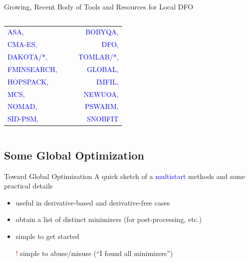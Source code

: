 \documentclass[handout,aspectratio=54]{beamer}
\numberwithin{theorem}{section}
\begin{document}
\begin{frame}{Growing, Recent Body of Tools and Resources for Local DFO}
\begin{columns}
\begin{center}
\ttfamily
\begin{table}[]
\begin{tabular}{llr}
\textcolor{blue}{ASA,} & $\quad$ & \textcolor{blue}{BOBYQA,}\\
\textcolor{blue}{CMA-ES,} & $\quad$ & \textcolor{blue}{DFO,}\\
\textcolor{blue}{DAKOTA/*,} & $\quad$ & \textcolor{blue}{TOMLAB/*,}\\
\textcolor{blue}{FMINSEARCH,} & $\quad$ & \textcolor{blue}{GLOBAL,}\\
\textcolor{blue}{HOPSPACK,} & $\quad$ & \textcolor{blue}{IMFIL,}\\
\textcolor{blue}{MCS,} & $\quad$ & \textcolor{blue}{NEWUOA,}\\
\textcolor{blue}{NOMAD,} & $\quad$ & \textcolor{blue}{PSWARM,}\\
\textcolor{blue}{SID-PSM,} & $\quad$ & \textcolor{blue}{SNOBFIT}
\end{tabular}
\end{table}
\end{center}
\end{columns}
\end{frame}

\subsection{Some Global Optimization}
\begin{frame}{Toward Global Optimization}
A quick sketch of a \textcolor{blue}{multistart} methods and some practical details

\begin{itemize}
\item useful in derivative-based and derivative-free cases
\item obtain a list of distinct minimizers (for post-processing, etc.)
\item simple to get started
\item[\textcolor{red}{!}] simple to abuse/misuse (“I found all minimizers”)
\end{itemize}
\end{frame}
\end{document}
